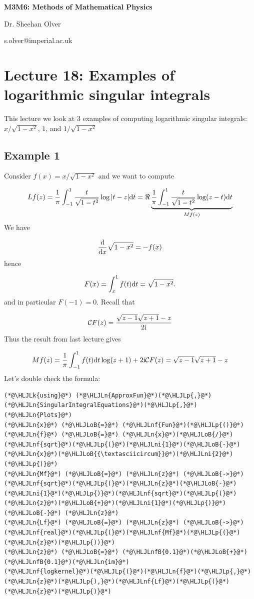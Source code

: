 \documentclass[12pt,a4paper]{article}
\newcommand{\HLJLk}[1]{\textcolor[RGB]{148,91,176}{\textbf{#1}}}
\newcommand{\HLJLn}[1]{#1}
\newcommand{\HLJLnf}[1]{\textcolor[RGB]{66,102,213}{#1}}
\newcommand{\HLJLnfB}[1]{\textcolor[RGB]{59,151,46}{#1}}
\newcommand{\HLJLni}[1]{\textcolor[RGB]{59,151,46}{#1}}
\newcommand{\HLJLoB}[1]{\textcolor[RGB]{102,102,102}{\textbf{#1}}}
\newcommand{\HLJLp}[1]{#1}
\def\D{ {\rm d} }
\def\I{ {\rm i} }
\def\CC{ {\cal C} }
\def\dx{\D x}
\begin{document}
\textbf{M3M6: Methods of Mathematical Physics}

Dr. Sheehan Olver

s.olver@imperial.ac.uk

\section{Lecture 18: Examples of logarithmic singular integrals}
This lecture we look at 3 examples of computing logarithmic singular integrals: $x/\sqrt{1-x^2}$, $1$,  and $1/\sqrt{1-x^2}$

\subsection{Example 1}
Consider $f(x) = x/\sqrt{1-x^2}$ and we want to compute

\[
L f(z) = {1 \over \pi} \int_{-1}^1 {t \over \sqrt{1-t^2}} \log|t-z| \D t = \Re \underbrace{{1 \over \pi} \int_{-1}^1 {t \over \sqrt{1-t^2}} \log(z-t) \D t }_{M f(z)}
\]
We have 

\[
{\D \over \dx} \sqrt{1-x^2} = - f(x)
\]
hence

\[
F(x) = \int_x^1 f(t) \D t = \sqrt{1-x^2}.
\]
and in particular $F(-1) = 0$. Recall that 

\[
\CC F(z) = {\sqrt{z-1} \sqrt{z+1} - z\over 2 \I} 
\]
Thus the result from last lecture gives

\[
M f(z) = {1 \over \pi} \int_{-1}^1 f(t) \D t \log(z+1)+ 2 \I \CC F(z) = \sqrt{z-1} \sqrt{z+1} - z
\]
Let's double check the formula:


\begin{lstlisting}
(*@\HLJLk{using}@*) (*@\HLJLn{ApproxFun}@*)(*@\HLJLp{,}@*) (*@\HLJLn{SingularIntegralEquations}@*)(*@\HLJLp{,}@*) (*@\HLJLn{Plots}@*)
(*@\HLJLn{x}@*) (*@\HLJLoB{=}@*) (*@\HLJLnf{Fun}@*)(*@\HLJLp{()}@*)
(*@\HLJLn{f}@*) (*@\HLJLoB{=}@*) (*@\HLJLn{x}@*)(*@\HLJLoB{/}@*)(*@\HLJLnf{sqrt}@*)(*@\HLJLp{(}@*)(*@\HLJLni{1}@*)(*@\HLJLoB{-}@*)(*@\HLJLn{x}@*)(*@\HLJLoB{{\textasciicircum}}@*)(*@\HLJLni{2}@*)(*@\HLJLp{)}@*)
(*@\HLJLn{Mf}@*) (*@\HLJLoB{=}@*) (*@\HLJLn{z}@*) (*@\HLJLoB{->}@*) (*@\HLJLnf{sqrt}@*)(*@\HLJLp{(}@*)(*@\HLJLn{z}@*)(*@\HLJLoB{-}@*)(*@\HLJLni{1}@*)(*@\HLJLp{)}@*)(*@\HLJLnf{sqrt}@*)(*@\HLJLp{(}@*)(*@\HLJLn{z}@*)(*@\HLJLoB{+}@*)(*@\HLJLni{1}@*)(*@\HLJLp{)}@*) (*@\HLJLoB{-}@*) (*@\HLJLn{z}@*)
(*@\HLJLn{Lf}@*) (*@\HLJLoB{=}@*) (*@\HLJLn{z}@*) (*@\HLJLoB{->}@*) (*@\HLJLnf{real}@*)(*@\HLJLp{(}@*)(*@\HLJLnf{Mf}@*)(*@\HLJLp{(}@*)(*@\HLJLn{z}@*)(*@\HLJLp{))}@*)
(*@\HLJLn{z}@*) (*@\HLJLoB{=}@*) (*@\HLJLnfB{0.1}@*)(*@\HLJLoB{+}@*)(*@\HLJLnfB{0.1}@*)(*@\HLJLn{im}@*)
(*@\HLJLnf{logkernel}@*)(*@\HLJLp{(}@*)(*@\HLJLn{f}@*)(*@\HLJLp{,}@*)(*@\HLJLn{z}@*)(*@\HLJLp{),}@*)(*@\HLJLnf{Lf}@*)(*@\HLJLp{(}@*)(*@\HLJLn{z}@*)(*@\HLJLp{)}@*)
\end{lstlisting}
\end{document}
